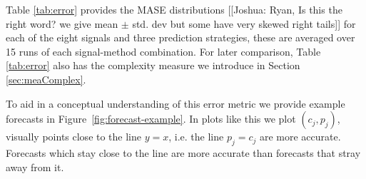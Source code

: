 Table \ref{tab:error} provides the MASE distributions {\color{red}[[Joshua: Ryan, Is this the right word? we give mean $\pm$ std. dev but some have very skewed right tails]]} for each of the eight signals and three prediction strategies, these are averaged over 15 runs of each signal-method combination. For later comparison, Table \ref{tab:error} also has the complexity measure we introduce in Section  \ref{sec:meaComplex}. 



To aid in a conceptual understanding of this error metric we provide example forecasts in Figure~\ref{fig:forecast-example}. In plots like this we plot $(c_j,p_j)$, visually points close to the line $y=x$, i.e. the line $p_j = c_j$ are more accurate. Forecasts which stay close to the line are more accurate than forecasts that stray away from it. 


